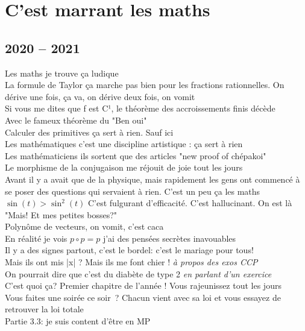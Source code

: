 \documentclass[french, a4paper, openany]{book}
\begin{document}
\chapter{C'est marrant les maths}

\section{2020 -- 2021}

	\noindent \og Les maths je trouve ça ludique \fg \\
	\og La formule de Taylor ça marche pas bien pour les fractions rationnelles. On dérive une fois, ça va, on dérive deux fois, on vomit \fg \\
	\og Si vous me dites que f est C¹, le théorème des accroissements finis décède \fg \\
	\og Avec le fameux théorème du "Ben oui" \fg \\
	\og Calculer des primitives ça sert à rien. Sauf ici \fg \\
	\og Les mathématiques c'est une discipline artistique : ça sert à rien \fg \\
	\og Les mathématiciens ils sortent que des articles "new proof of chépakoi" \fg \\
	\og Le morphisme de la conjugaison me réjouit de joie tout les jours \fg \\
	\og Avant il y a avait que de la physique, mais rapidement les gens ont commencé à se poser des questions qui servaient à rien. C'est un peu ça les maths \fg \\
	$\sin(t) > \sin^2(t)$ \og C'est fulgurant d'efficacité. C'est hallucinant. On est là "Mais! Et mes petites bosses?" \fg \\
	\og Polynôme de vecteurs, on vomit, c'est caca \fg \\
	\og En réalité je vois $p \circ p = p$ j'ai des pensées secrètes inavouables \fg \\
	\og Il y a des signes partout, c'est le bordel: c'est le mariage pour tous! \fg \\
	\og Mais ils ont mis |x| ? Mais ils me font chier ! \fg \emph{à propos des exos CCP} \\
	\og On pourrait dire que c'est du diabète de type 2 \fg \emph{en parlant d'un exercice} \\
	\og C'est quoi ça? Premier chapitre de l'année ! Vous rajeunissez tout les jours \fg \\
	\og Vous faites une soirée ce soir~? Chacun vient avec sa loi et vous essayez de retrouver la loi totale \fg \\
	\og Partie 3.3: je suis content d'être en MP \fg \\
\end{document}
